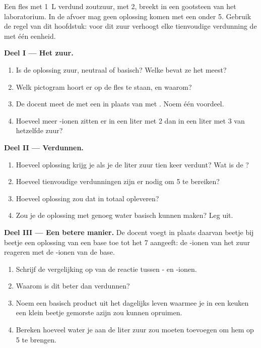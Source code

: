 \begin{problem}
\label{pb:g9:acids-bases-ph:1}
Een fles met \qty{1}{L} verdund zoutzuur, met  2, breekt in een
gootsteen van het laboratorium. In de afvoer mag geen oplossing komen met
een  onder 5. Gebruik de regel van dit hoofdstuk: voor dit zuur
verhoogt elke tienvoudige verdunning de  met één eenheid.

\medskip
\noindent\textbf{Deel I --- Het zuur.}
\begin{enumerate}
  \item Is de oplossing zuur, neutraal of basisch? Welke  bevat ze
        het meest?
  \item Welk pictogram hoort er op de fles te staan, en waarom?
  \item De docent meet de  met een  in plaats van met
        . Noem één voordeel.
  \item Hoeveel meer -ionen zitten er in een liter met  2 dan in
        een liter met  3 van hetzelfde zuur?
\end{enumerate}

\medskip
\noindent\textbf{Deel II --- Verdunnen.}
\begin{enumerate}[resume]
  \item Hoeveel oplossing krijg je als je de liter zuur tien keer
        verdunt? Wat is de ?
  \item Hoeveel tienvoudige verdunningen zijn er nodig om  5 te
        bereiken?
  \item Hoeveel oplossing zou dat in totaal opleveren?
  \item Zou je de oplossing met genoeg water basisch kunnen maken? Leg
        uit.
\end{enumerate}

\medskip
\noindent\textbf{Deel III --- Een betere manier.}
De docent voegt in plaats daarvan beetje bij beetje een oplossing van een
base toe tot het  7 aangeeft: de -ionen van het zuur
reageren met de -ionen van de base.
\begin{enumerate}[resume]
  \item Schrijf de vergelijking op van de reactie tussen - en
        -ionen.
  \item Waarom is dit beter dan verdunnen?
  \item Noem een basisch product uit het dagelijks leven waarmee je in
        een keuken een klein beetje gemorste azijn zou kunnen opruimen.
  \item Bereken hoeveel water je aan de liter zuur zou moeten toevoegen om
        hem op  5 te brengen.
\end{enumerate}
\end{problem}
